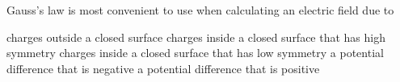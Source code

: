 \documentclass{../../oss-apphys-exam}
\begin{document}
\begin{multicols*}{2}
\begin{questions}
    \question Gauss's law is most convenient to use when calculating an electric
    field due to
    \begin{choices}
      \choice charges outside a closed surface
      \choice charges inside a closed surface that has high symmetry
      \choice charges inside a closed surface that has low symmetry
      \choice a potential difference that is negative
      \choice a potential difference that is positive
    \end{choices}
    \columnbreak
    
%
%

\end{questions}
\end{multicols*}
\end{document}
